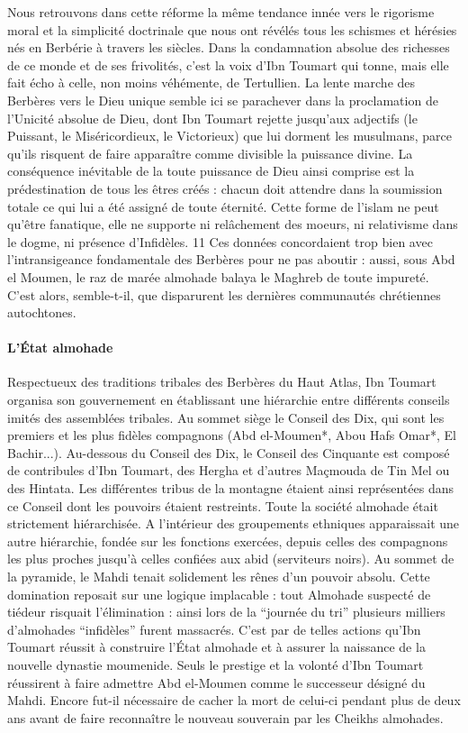 Nous retrouvons dans cette réforme la même tendance innée vers le rigorisme moral et la
simplicité doctrinale que nous ont révélés tous les schismes et hérésies nés en Berbérie à travers
les siècles.
Dans la condamnation absolue des richesses de ce monde et de ses frivolités, c’est la voix
d’Ibn Toumart qui tonne, mais elle fait écho à celle, non moins véhémente, de Tertullien. La
lente marche des Berbères vers le Dieu unique semble ici se parachever dans la proclamation
de l’Unicité absolue de Dieu, dont Ibn Toumart rejette jusqu’aux adjectifs (le Puissant,
le Miséricordieux, le Victorieux) que lui dorment les musulmans, parce qu’ils risquent de
faire apparaître comme divisible la puissance divine. La conséquence inévitable de la toute puissance
de Dieu ainsi comprise est la prédestination de tous les êtres créés : chacun doit
attendre dans la soumission totale ce qui lui a été assigné de toute éternité.
Cette forme de l’islam ne peut qu’être fanatique, elle ne supporte ni relâchement des moeurs,
ni relativisme dans le dogme, ni présence d’Infidèles.
11 Ces données concordaient trop bien avec l’intransigeance fondamentale des Berbères pour ne
pas aboutir : aussi, sous Abd el Moumen, le raz de marée almohade balaya le Maghreb de
toute impureté. C’est alors, semble-t-il, que disparurent les dernières communautés chrétiennes
autochtones.
\paragraph{L’État almohade}
Respectueux des traditions tribales des Berbères du Haut Atlas, Ibn Toumart organisa son
gouvernement en établissant une hiérarchie entre différents conseils imités des assemblées
tribales. Au sommet siège le Conseil des Dix, qui sont les premiers et les plus fidèles
compagnons (Abd el-Moumen*, Abou Hafs Omar*, El Bachir...). Au-dessous du Conseil
des Dix, le Conseil des Cinquante est composé de contribules d’Ibn Toumart, des Hergha et
d’autres Maçmouda de Tin Mel ou des Hintata. Les différentes tribus de la montagne étaient
ainsi représentées dans ce Conseil dont les pouvoirs étaient restreints.
Toute la société almohade était strictement hiérarchisée. A l’intérieur des groupements
ethniques apparaissait une autre hiérarchie, fondée sur les fonctions exercées, depuis celles
des compagnons les plus proches jusqu’à celles confiées aux abid (serviteurs noirs). Au
sommet de la pyramide, le Mahdi tenait solidement les rênes d’un pouvoir absolu. Cette
domination reposait sur une logique implacable : tout Almohade suspecté de tiédeur risquait
l’élimination : ainsi lors de la “journée du tri” plusieurs milliers d’almohades “infidèles” furent
massacrés. C’est par de telles actions qu’Ibn Toumart réussit à construire l’État almohade et à
assurer la naissance de la nouvelle dynastie moumenide. Seuls le prestige et la volonté d’Ibn
Toumart réussirent à faire admettre Abd el-Moumen comme le successeur désigné du Mahdi.
Encore fut-il nécessaire de cacher la mort de celui-ci pendant plus de deux ans avant de faire
reconnaître le nouveau souverain par les Cheikhs almohades.
